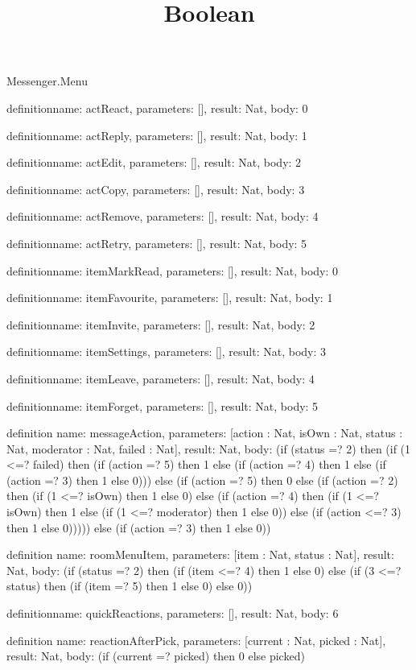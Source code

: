 \begin{lexlean}{Messenger.Menu}
\title{Boolean}
\begin{semanticmodule}
definition{name: actReact, parameters: [], result: Nat, body: 0}

definition{name: actReply, parameters: [], result: Nat, body: 1}

definition{name: actEdit, parameters: [], result: Nat, body: 2}

definition{name: actCopy, parameters: [], result: Nat, body: 3}

definition{name: actRemove, parameters: [], result: Nat, body: 4}

definition{name: actRetry, parameters: [], result: Nat, body: 5}

definition{name: itemMarkRead, parameters: [], result: Nat, body: 0}

definition{name: itemFavourite, parameters: [], result: Nat, body: 1}

definition{name: itemInvite, parameters: [], result: Nat, body: 2}

definition{name: itemSettings, parameters: [], result: Nat, body: 3}

definition{name: itemLeave, parameters: [], result: Nat, body: 4}

definition{name: itemForget, parameters: [], result: Nat, body: 5}

definition{
  name: messageAction,
  parameters: [action : Nat, isOwn : Nat, status : Nat, moderator : Nat, failed : Nat],
  result: Nat,
  body: (if (status =? 2) then (if (1 <=? failed) then (if (action =? 5) then 1 else (if (action =? 4) then 1 else (if (action =? 3) then 1 else 0))) else (if (action =? 5) then 0 else (if (action =? 2) then (if (1 <=? isOwn) then 1 else 0) else (if (action =? 4) then (if (1 <=? isOwn) then 1 else (if (1 <=? moderator) then 1 else 0)) else (if (action <=? 3) then 1 else 0))))) else (if (action =? 3) then 1 else 0))
}

definition{
  name: roomMenuItem,
  parameters: [item : Nat, status : Nat],
  result: Nat,
  body: (if (status =? 2) then (if (item <=? 4) then 1 else 0) else (if (3 <=? status) then (if (item =? 5) then 1 else 0) else 0))
}

definition{name: quickReactions, parameters: [], result: Nat, body: 6}

definition{
  name: reactionAfterPick,
  parameters: [current : Nat, picked : Nat],
  result: Nat,
  body: (if (current =? picked) then 0 else picked)
}
\end{semanticmodule}
\end{lexlean}
